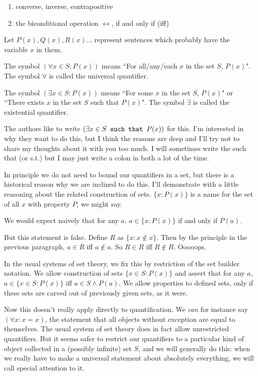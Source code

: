 \documentclass[12pt]{article}
\begin{document}
\begin{enumerate}

\item converse, inverse, contrapositive

\item the biconditional operation $\leftrightarrow$, if and only if (iff)

\end{enumerate}

Let $P(x), Q(x), R(x)\ldots$ represent sentences which probably have the variable $x$ in them.

The symbol $(\forall x \in S:P(x))$  means ``For all/any/each $x$ in the set $S$, $P(x)$".  The symbol $\forall$ is called the universal quantifier.

The symbol $(\exists x \in S:P(x))$ means ``For some $x$ in the set $S$, $P(x)$" or ``There exists $x$ in the set $S$ such that $P(x)$".  The symbol $\exists$ is called the existential quantifier.

 The authors like to write $(\exists x \in S \verb| such that |P(x))$ for this.  I'm interested in why they want to do this, but I think the reasons are deep and I'll try not to share my thoughts about it with you too much.  I will sometimes write the such that (or s.t.) but I may just write a colon in both a lot of the time.

In principle we do not need to bound our quantifiers in a set, but there is a historical reason why we are inclined to do this.  I'll demonstrate with a little reasoning about the related construction of sets.  $\{x : P(x)\}$ is a name for the set of all $x$ with property $P$, we might say.

We would expect naively that for any $a$, $a \in \{x:P(x)\}$ if and only if $P(a)$.  

But this statement is false.  Define $R$ as $\{x: x \not\in x\}$.  Then by the principle in the previous paragraph,
$a \in R$ iff $a \not\in a$.  So $R \in R$ iff $R \not\in R$.  Ooooops.

In the usual systems of set theory, we fix this by restriction of the set builder notation.  We allow construction of sets $\{x \in S:P(x)\}$ and assert that for any $a$, $a \in \{x \in S:P(x)\}$ iff $a \in S \wedge P(a)$.  We allow properties to defined sets, only if these sets are carved out of previously given sets, as it were.

Now this doesn't really apply directly to quantification.  We {\em can\/} for instance say $(\forall x:x=x)$, the statement that all objects without exception are equal to themselves.  The usual system of set theory does in fact allow unrestricted quantifiers.  But it seems safer to restrict our quantifiers to a particular kind of object collected in a (possibly infinite) set $S$, and we will generally do this:  when we really have to make a universal statement about absolutely everything, we will call special attention to it.
\end{document}
